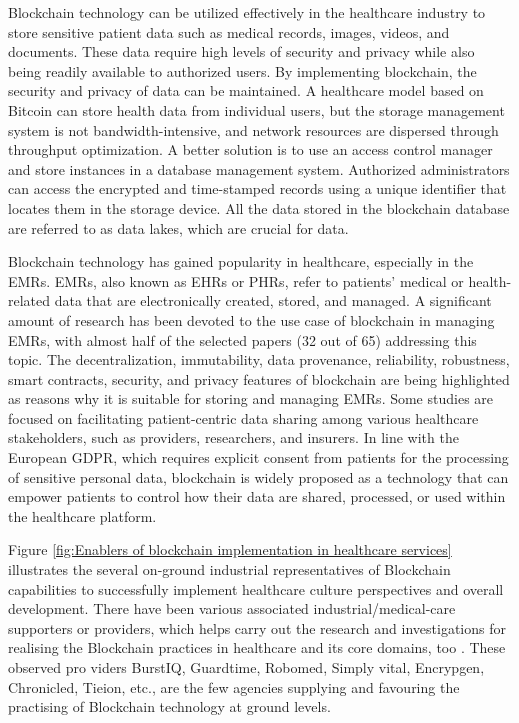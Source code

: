 Blockchain technology can be utilized effectively in the healthcare industry to store sensitive patient data such as medical records, images, videos, and documents. These data require high levels of security and privacy while also being readily available to authorized users. By implementing blockchain, the security and privacy of data can be maintained. A healthcare model based on Bitcoin can store health data from individual users, but the storage management system is not bandwidth-intensive, and network resources are dispersed through throughput optimization. A better solution is to use an access control manager and store instances in a database management system. Authorized administrators can access the encrypted and time-stamped records using a unique identifier that locates them in the storage device. All the data stored in the blockchain database are referred to as data lakes, which are crucial for data.


Blockchain technology has gained popularity in healthcare, especially in the \ac{EMRs}. \ac{EMRs}, also known as \ac{EHRs} or \ac{PHRs}, refer to patients' medical or health-related data that are electronically created, stored, and managed. A significant amount of research has been devoted to the use case of blockchain in managing \ac{EMRs}, with almost half of the selected papers (32 out of 65) addressing this topic. The decentralization, immutability, data provenance, reliability, robustness, smart contracts, security, and privacy features of blockchain are being highlighted as reasons why it is suitable for storing and managing \ac{EMRs}. Some studies are focused on facilitating patient-centric data sharing among various healthcare stakeholders, such as providers, researchers, and insurers. In line with the European  \ac{GDPR}, which requires explicit consent from patients for the processing of sensitive personal data, blockchain is widely proposed as a technology that can empower patients to control how their data are shared, processed, or used within the healthcare platform.


 Figure \ref{fig:Enablers of blockchain implementation in healthcare services} illustrates the several on-ground industrial representatives of
Blockchain capabilities to successfully implement healthcare culture perspectives and overall development. There have been various associated industrial/medical-care supporters or providers, which helps carry out the research and investigations for realising the Blockchain practices in healthcare and its core domains, too \cite{nguyen2018}\cite{kumar2020}. These observed pro
viders BurstIQ, Guardtime, Robomed, Simply vital, Encrypgen, Chronicled, Tieion, etc., are the few agencies supplying and favouring the
practising of Blockchain technology at ground levels.


